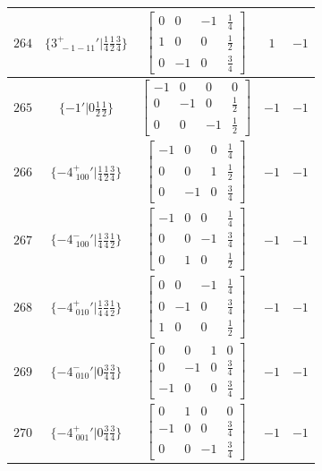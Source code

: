 \documentclass[fleqn,8pt]{jsarticle}
\begin{document}
\begin{longtable}{ccccc}
$ 264 $ & $ \{3^{+}_{\,\,-1-11}{}'|\frac{1}{4} \frac{1}{2} \frac{3}{4}\} $ & $ \begin{bmatrix} 0 & 0 & -1 & \frac{1}{4} \\ 1 & 0 & 0 & \frac{1}{2} \\ 0 & -1 & 0 & \frac{3}{4} \end{bmatrix} $ & $ 1 $ & $ -1 $ \\ \hline
$ 265 $ & $ \{-1{}'|0 \frac{1}{2} \frac{1}{2}\} $ & $ \begin{bmatrix} -1 & 0 & 0 & 0 \\ 0 & -1 & 0 & \frac{1}{2} \\ 0 & 0 & -1 & \frac{1}{2} \end{bmatrix} $ & $ -1 $ & $ -1 $ \\ \hline
$ 266 $ & $ \{-4^{+}_{\,\,100}{}'|\frac{1}{4} \frac{1}{2} \frac{3}{4}\} $ & $ \begin{bmatrix} -1 & 0 & 0 & \frac{1}{4} \\ 0 & 0 & 1 & \frac{1}{2} \\ 0 & -1 & 0 & \frac{3}{4} \end{bmatrix} $ & $ -1 $ & $ -1 $ \\ \hline
$ 267 $ & $ \{-4^{-}_{\,\,100}{}'|\frac{1}{4} \frac{3}{4} \frac{1}{2}\} $ & $ \begin{bmatrix} -1 & 0 & 0 & \frac{1}{4} \\ 0 & 0 & -1 & \frac{3}{4} \\ 0 & 1 & 0 & \frac{1}{2} \end{bmatrix} $ & $ -1 $ & $ -1 $ \\ \hline
$ 268 $ & $ \{-4^{+}_{\,\,010}{}'|\frac{1}{4} \frac{3}{4} \frac{1}{2}\} $ & $ \begin{bmatrix} 0 & 0 & -1 & \frac{1}{4} \\ 0 & -1 & 0 & \frac{3}{4} \\ 1 & 0 & 0 & \frac{1}{2} \end{bmatrix} $ & $ -1 $ & $ -1 $ \\ \hline
$ 269 $ & $ \{-4^{-}_{\,\,010}{}'|0 \frac{3}{4} \frac{3}{4}\} $ & $ \begin{bmatrix} 0 & 0 & 1 & 0 \\ 0 & -1 & 0 & \frac{3}{4} \\ -1 & 0 & 0 & \frac{3}{4} \end{bmatrix} $ & $ -1 $ & $ -1 $ \\ \hline
$ 270 $ & $ \{-4^{+}_{\,\,001}{}'|0 \frac{3}{4} \frac{3}{4}\} $ & $ \begin{bmatrix} 0 & 1 & 0 & 0 \\ -1 & 0 & 0 & \frac{3}{4} \\ 0 & 0 & -1 & \frac{3}{4} \end{bmatrix} $ & $ -1 $ & $ -1 $ \\ \hline

\end{longtable}
\end{document}
